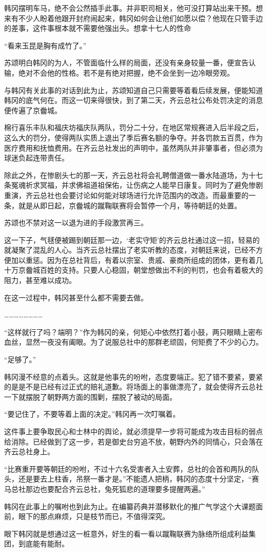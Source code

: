韩冈摆明车马，绝不会公然插手此事。并非职司相关，他可没打算站出来干预。想来有不少人盼着他跟开封府闹起来，韩冈如何会让他们如愿以偿？他现在只管手边的差事，这件事根本就不需要他强出头。想拿十七人的性命

“看来玉昆是胸有成竹了。”

苏颂明白韩冈的为人，不管面临什么样的局面，还没有亲身较量一番，便宣告认输，绝对不会他的性格。若不是有绝对把握，绝不会坐到一边冷眼旁观。

与韩冈有关此事的对话到此为止，苏颂知道自己只需要等着看后续发展，便能知道韩冈的底气何在。而这一切来得很快，到了第二天，齐云总社公布处罚决定的消息便传遍了京齤城。

棉行喜乐丰队和福庆坊福庆队两队，罚分二十分，在地区常规赛进入后半段之后，这么大的罚分，使得两队实质上退出了季后赛名额的争夺。并各罚款五百贯，作为医疗费用和抚恤费用。在齐云总社发出的声明中，虽然两队并非肇事者，但必须为球迷负起连带责任。

除此之外，在惨剧头七的那一天，齐云总社将会礼聘僧道做一番水陆道场，为十七条冤魂祈求冥福，并求佛祖道祖保佑，让伤病之人能早日康复。同时为了避免惨剧重演，齐云总社也会要讨论如何能对球场进行允许范围内的改造。而最重要的一条，就是从即日起，京齤城的蹴鞠联赛将会暂停一个月，等待朝廷的处置。

苏颂也不禁对这一以退为进的手段激赏再三。

这一下子，气毬便被踢到朝廷那一边，‘老实守矩’的齐云总社通过这一招，轻易的就凝聚了混乱的人心。当齐云总社摆出了老实听教的态度，对朝廷来说，已经不方便加以重惩。因为在总社背后，有着以宗室、贵戚、豪商所组成的团体，更有着几十万京齤城百姓的支持。只要人心稳固，朝堂想做出不利的判罚，也会有着极大的阻力，甚至难以成功。

在这一过程中，韩冈甚至什么都不需要去做。

……………………

“这样就行了吗？端明？”作为韩冈的亲，何矩心中依然打着小鼓，两只眼睛上密布血丝，显然一夜没有阖眼。为了说服总社中的那群老顽固，何矩费了不少的心力。

“足够了。”

韩冈漫不经意的点着头。这就是他事先的吩咐，态度要端正。犯了错不要紧，要紧的是是不是已经有过正式的赔礼道歉。将场面上的事做漂亮了，就会使得齐云总社一下就摆脱了朝野两方面的围剿，摆脱了被动的局面。

“要记住了，不要等着上面的决定。”韩冈再一次叮嘱着。

这件事上要争取民心和士林中的舆论，就必须提早一步将可能成为攻击目标的弱点给消除。已经做到了这一步，若是御史台穷追不放，朝野内外的同情心，只会落在齐云总社身上。

“比赛重开要等朝廷的吩咐，不过十六名受害者入土安葬，总社的会首和两队的队头，还是要去上柱香，吊祭一番才是。”不能遗人把柄，韩冈的态度十分坚定，“赛马总社那边也要配合齐云总社，兔死狐悲的道理要多提醒两遍。”

韩冈在此事上的嘱咐也到此为止。在编纂药典并潜移默化的推广气学这个大课题面前，眼下的那点麻烦，只是枝节而已，不值得深究。

眼下韩冈就是想通过这一桩意外，好生的看一看以蹴鞠联赛为脉络所组成利益集团，到底能有能耐。

